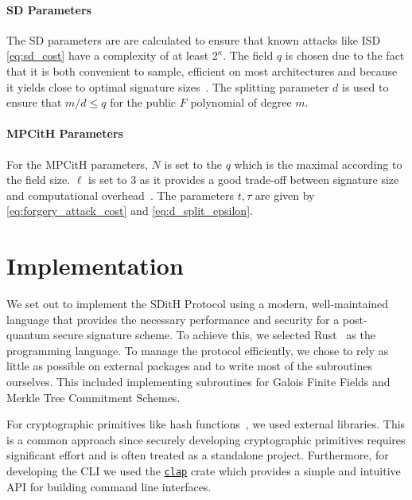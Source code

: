 \documentclass[11pt]{report}
\theoremstyle{definition}
\theoremstyle{plain}
\begin{document}
\subsubsection{SD Parameters}

The SD parameters are are calculated to ensure that known attacks like ISD \autoref{eq:sd_cost} have a complexity of at least $2^\kappa$. The field $q$ is chosen due to the fact that it is both convenient to sample, efficient on most architectures and because it yields close to optimal signature sizes~\cite{aguilarsyndrome11}. The splitting parameter $d$ is used to ensure that $m/d \leq q$ for the public $F$ polynomial of degree $m$.

\subsubsection{MPCitH Parameters}

For the MPCitH parameters, $N$ is set to the $q$ which is the maximal according to the field size. $\ell$ is set to $3$ as it provides a good trade-off between signature size and computational overhead~\cite{aguilarsyndrome11}. The parameters $t, \tau$ are given by \autoref{eq:forgery_attack_cost} and \autoref{eq:d_split_epsilon}.




\chapter{Implementation}\label{ch:impl}

We set out to implement the SDitH Protocol using a modern, well-maintained language that provides the necessary performance and security for a post-quantum secure signature scheme. To achieve this, we selected Rust~\cite{rustlangRustProgramming,nistsaferlanguages,lurklurkEffectiveRust,rustlangPerformanceBook} as the programming language. To manage the protocol efficiently, we chose to rely as little as possible on external packages and to write most of the subroutines ourselves. This included implementing subroutines for Galois Finite Fields and Merkle Tree Commitment Schemes.

For cryptographic primitives like hash functions~\cite{blakethree,tinykeccak}, we used external libraries. This is a common approach since securely developing cryptographic primitives requires significant effort and is often treated as a standalone project. Furthermore, for developing the CLI we used the \href{https://docs.rs/clap/latest/clap/}{\texttt{clap}} crate which provides a simple and intuitive API for building command line interfaces.
\end{document}

